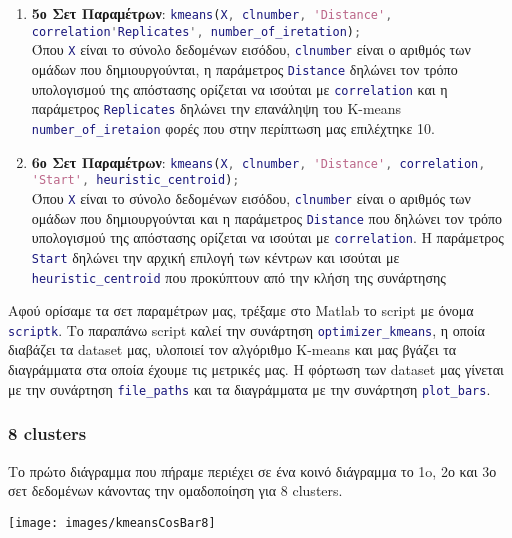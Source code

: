 \begin{enumerate}
\item \textbf{5ο Σετ Παραμέτρων}:
\lstinline[language=MATLAB, breaklines=true]!kmeans(X, clnumber, 'Distance', correlation'Replicates', number_of_iretation);!
\\Όπου
\lstinline[language=MATLAB]!X! είναι το σύνολο δεδομένων εισόδου,
\lstinline[language=MATLAB]!clnumber! είναι ο αριθμός των ομάδων που δημιουργούνται, η παράμετρος
\lstinline[language=MATLAB]!Distance! δηλώνει τον τρόπο υπολογισμού της απόστασης ορίζεται να ισούται με
\lstinline[language=MATLAB]!correlation! και η παράμετρος \lstinline[language=MATLAB]!Replicates! δηλώνει την επανάληψη του K-means
\lstinline[language=MATLAB]!number_of_iretaion! φορές που στην περίπτωση μας επιλέχτηκε 10.

\item \textbf{6ο Σετ Παραμέτρων}:
\lstinline[language=MATLAB, breaklines=true]!kmeans(X, clnumber, 'Distance', correlation, 'Start', heuristic_centroid);!
\\Όπου
\lstinline[language=MATLAB]!X! είναι το σύνολο δεδομένων εισόδου,
\lstinline[language=MATLAB]!clnumber! είναι ο αριθμός των ομάδων που δημιουργούνται και η παράμετρος
\lstinline[language=MATLAB]!Distance! που δηλώνει τον τρόπο υπολογισμού της απόστασης ορίζεται να ισούται με
\lstinline[language=MATLAB]!correlation!.
Η παράμετρος \lstinline[language=MATLAB]!Start! δηλώνει την αρχική επιλογή των κέντρων και ισούται με
\lstinline[language=MATLAB]!heuristic_centroid! που προκύπτουν από την κλήση της συνάρτησης
\end{enumerate}

Αφού ορίσαμε τα σετ παραμέτρων μας, τρέξαμε στο Matlab το script με όνομα \lstinline[language=MATLAB]!scriptk!.
Tο παραπάνω script καλεί την συνάρτηση \lstinline[language=MATLAB]!optimizer_kmeans!, η οποία διαβάζει τα dataset μας, υλοποιεί τον αλγόριθμο K-means και μας βγάζει τα διαγράμματα στα οποία έχουμε τις μετρικές μας.
\label{Kmeans8}
Η φόρτωση των dataset μας γίνεται με την συνάρτηση \lstinline[language=MATLAB]!file_paths! και τα διαγράμματα με την συνάρτηση \lstinline[language=MATLAB]!plot_bars!.

\subsubsection{8 clusters}
Το πρώτο διάγραμμα που πήραμε περιέχει σε ένα κοινό διάγραμμα το 1o, 2ο και 3ο σετ δεδομένων κάνοντας την ομαδοποίηση για 8 clusters.

\noindent\begin{minipage}{\linewidth}
    \centering
    \texttt{[image: images/kmeansCosBar8]}
    \label{fig:kmeansCosBar8}
\end{minipage}

